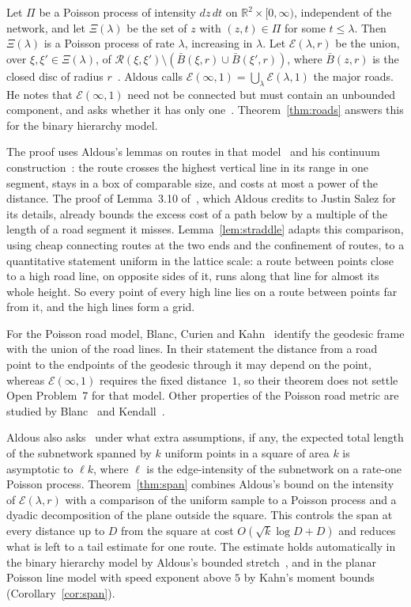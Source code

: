 \documentclass[11pt]{amsart}
\theoremstyle{remark}
\newcommand{\R}{\mathbb{R}}
\begin{document}
Let $\Pi$ be a Poisson process of intensity $dz\,dt$ on $\R^2\times[0,\infty)$, independent of the network, and let
$\Xi(\lambda)$ be the set of $z$ with $(z,t)\in\Pi$ for some $t\le\lambda$. Then $\Xi(\lambda)$ is a Poisson process of
rate $\lambda$, increasing in $\lambda$. Let $\mathcal E(\lambda,r)$ be the union, over $\xi,\xi'\in\Xi(\lambda)$, of
$\mathcal R(\xi,\xi')\setminus(\bar B(\xi,r)\cup\bar B(\xi',r))$, where $\bar B(z,r)$ is the closed disc of radius
$r$~\cite[(2.17)]{A14}. Aldous calls $\mathcal E(\infty,1)=\bigcup_\lambda\mathcal E(\lambda,1)$ the major roads. He
notes that $\mathcal E(\infty,1)$ need not be connected but must contain an unbounded component, and asks whether it
has only one~\cite[Open Problem~7]{A14}. Theorem~\ref{thm:roads} answers this for the binary hierarchy model.

The proof uses Aldous's lemmas on routes in that model~\cite[Lemmas~3.2, 3.3 and~3.7]{A14} and his continuum
construction~\cite[Proposition~3.8]{A14}: the route crosses the highest vertical line in its range in one segment,
stays in a box of comparable size, and costs at most a power of the distance. The proof of Lemma~3.10 of~\cite{A14},
which Aldous credits to Justin Salez for its details, already bounds the excess cost of a path below by a multiple of
the length of a road segment it misses. Lemma~\ref{lem:straddle} adapts this comparison, using cheap connecting routes
at the two ends and the confinement of routes, to a quantitative statement uniform in the lattice scale: a route
between points close to a high road line, on opposite sides of it, runs along that line for almost its whole height.
So every point of every high line lies on a route between points far from it, and the high lines form a grid.

For the Poisson road model, Blanc, Curien and Kahn~\cite[Theorem~2 and Propositions~4 and~5]{BCK25} identify the
geodesic frame with the union of the road lines. In their statement the distance from a road point to the endpoints of
the geodesic through it may depend on the point, whereas $\mathcal E(\infty,1)$ requires the fixed distance~$1$, so
their theorem does not settle Open Problem~7 for that model. Other properties of the Poisson road metric are studied
by Blanc~\cite{Bl24} and Kendall~\cite{K20}.

Aldous also asks~\cite[Open Problem~9]{A14} under what extra assumptions, if any, the expected total length of the
subnetwork spanned by $k$ uniform points in a square of area $k$ is asymptotic to $\ell k$, where $\ell$ is the
edge-intensity of the subnetwork on a rate-one Poisson process. Theorem~\ref{thm:span} combines Aldous's bound on the
intensity of $\mathcal E(\lambda,r)$ with a comparison of the uniform sample to a Poisson process and a dyadic
decomposition of the plane outside the square. This controls the span at every distance up to $D$ from the square at
cost $O(\sqrt k\log D+D)$ and reduces what is left to a tail estimate for one route. The estimate holds automatically
in the binary hierarchy model by Aldous's bounded stretch~\cite[Proposition~3.1]{A14}, and in the planar Poisson line
model with speed exponent above $5$ by Kahn's moment bounds~\cite[proof of Theorem~5.1]{Kahn16}
(Corollary~\ref{cor:span}).
\end{document}
